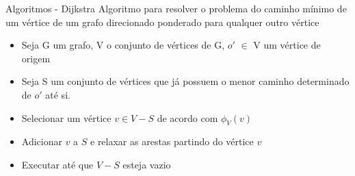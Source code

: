 \begin{frame}{Algoritmos - Dijkstra}
    Algoritmo para resolver o problema do caminho mínimo de um vértice de um grafo direcionado ponderado para qualquer outro vértice \cite{cormen2022introduction}
    \vspace{\baselineskip}
    \begin{itemize}
        \item Seja G um grafo, V o conjunto de vértices de G, $o'$ $\in$ V um vértice de origem
        \item Seja S um conjunto de vértices que já possuem o menor caminho determinado de $o'$ até si.
        \item Selecionar um vértice $v \in V-S$ de acordo com $\phi_V(v)$
        \item Adicionar $v$ a $S$ e relaxar as arestas partindo do vértice $v$
        \item Executar até que $V-S$ esteja vazio
    \end{itemize}
\end{frame}